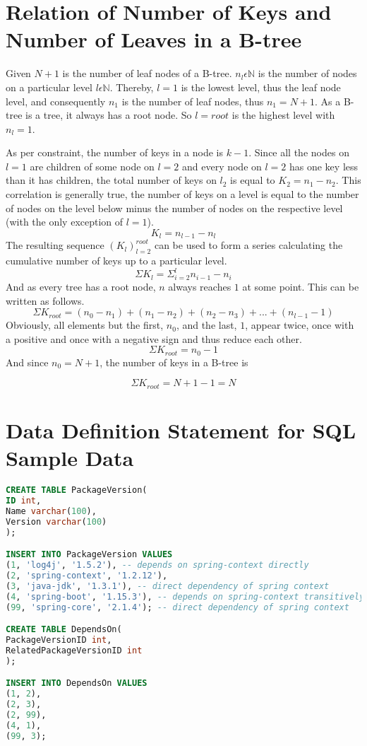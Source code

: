 \section{Relation of Number of Keys and Number of Leaves in a B-tree} \label{apx:Relation of Number of Keys and Number of Leaves in a B-tree}
Given $N+1$ is the number of leaf nodes of a B-tree. $n_{l} \epsilon  \mathbb{N}$ is the number of nodes on a particular level $l \epsilon \mathbb{N}$. Thereby, $l = 1$ is the lowest level, thus the leaf node level, and consequently $n_{1}$ is the number of leaf nodes, thus $n_{1} = N+1$. As a B-tree is a tree, it always has a root node. So $l = root$ is the highest level with $n_{l} = 1$.\par
As per constraint, the number of keys in a node is $k-1$. Since all the nodes on $l = 1$ are children of some node on $l = 2$ and every node on $l = 2$ has one key less than it has children, the total number of keys on $l_{2}$ is equal to $K_{2} = n_{1} - n_{2}$. This correlation is generally true, the number of keys on a level is equal to the number of nodes on the level below minus the number of nodes on the respective level (with the only exception of $l = 1$).
$$ K_{l} = n_{l-1} - n_{l} $$
The resulting sequence $(K_l)_{l=2}^{root}$ can be used to form a series calculating the cumulative number of keys up to a particular level.
$$\Sigma K_l = \Sigma_{i=2}^{l} n_{i-1} - n_{i} $$
And as every tree has a root node, $n$ always reaches $1$ at some point. This can be written as follows.
$$\Sigma K_{root} = (n_0 - n_1) + (n_1 - n_2) + (n_2 - n_3) + ... + (n_{l-1} - 1) $$
Obviously, all elements but the first, $n_0$, and the last, $1$, appear twice, once with a positive and once with a negative sign and thus reduce each other.
$$\Sigma K_{root} = n_0 - 1$$
And since $n_0 = N + 1$, the number of keys in a B-tree is

$$\Sigma K_{root} = N + 1 - 1 = N$$

\section{Data Definition Statement for SQL Sample Data} \label{apx:Data Definition Statement for SQL Sample Data}

\begin{lstlisting}[language=SQL, caption=DDL Statements, captionpos=b, label=lst:DDLStatements]
CREATE TABLE PackageVersion(
ID int,
Name varchar(100),
Version varchar(100)
);

INSERT INTO PackageVersion VALUES 
(1, 'log4j', '1.5.2'), -- depends on spring-context directly
(2, 'spring-context', '1.2.12'),
(3, 'java-jdk', '1.3.1'), -- direct dependency of spring context
(4, 'spring-boot', '1.15.3'), -- depends on spring-context transitively (spring-boot -> log4j -> spring-context)
(99, 'spring-core', '2.1.4'); -- direct dependency of spring context

CREATE TABLE DependsOn(
PackageVersionID int,
RelatedPackageVersionID int
);

INSERT INTO DependsOn VALUES 
(1, 2), 
(2, 3), 
(2, 99),
(4, 1),
(99, 3);
\end{lstlisting}

